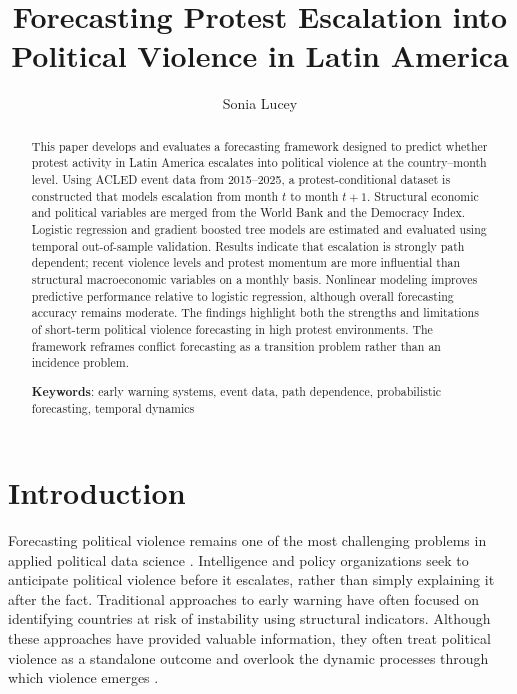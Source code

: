 \documentclass[12pt]{article}
\title{Forecasting Protest Escalation into Political Violence in Latin America}
\author{Sonia Lucey}
\begin{document}
\maketitle


\begin{abstract}
This paper develops and evaluates a forecasting framework designed to predict whether protest activity in Latin America escalates into political violence at the country--month level. Using ACLED event data from 2015--2025, a protest-conditional dataset is constructed that models escalation from month $t$ to month $t+1$. Structural economic and political variables are merged from the World Bank and the Democracy Index. Logistic regression and gradient boosted tree models are estimated and evaluated using temporal out-of-sample validation. Results indicate that escalation is strongly path dependent; recent violence levels and protest momentum are more influential than structural macroeconomic variables on a monthly basis. Nonlinear modeling improves predictive performance relative to logistic regression, although overall forecasting accuracy remains moderate. The findings highlight both the strengths and limitations of short-term political violence forecasting in high protest environments. The framework reframes conflict forecasting as a transition problem rather than an incidence problem.

\noindent\textbf{Keywords}: early warning systems, event data, path dependence, probabilistic forecasting, temporal dynamics

\end{abstract}

\section{Introduction}
\label{sec:intro}

Forecasting political violence remains one of the most challenging problems in applied political data science \citep{mueller2024conflict,hegre2019views}. Intelligence and policy organizations seek to anticipate political violence before it escalates, rather than simply explaining it after the fact. Traditional approaches to early warning have often focused on identifying countries at risk of instability using structural indicators. Although these approaches have provided valuable information, they often treat political violence as a standalone outcome and overlook the dynamic processes through which violence emerges \citep{hegre2019views}.
\end{document}
